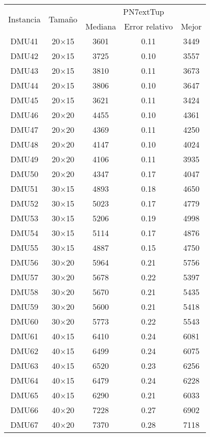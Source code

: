 \begin{table}[H]
\centering
\begin{tabular}{@{}ccccc@{}}
\toprule
\multirow{2}{*}{Instancia} & \multirow{2}{*}{Tamaño} & \multicolumn{3}{c}{PN7extTup} \\ \cmidrule(lr){3-5}
& & Mediana& Error relativo & Mejor  \\ \midrule
DMU41 & 20$\times$15 & 3601 & 0.11 & 3449\\ 
DMU42 & 20$\times$15 & 3725 & 0.10 & 3557\\ 
DMU43 & 20$\times$15 & 3810 & 0.11 & 3673\\ 
DMU44 & 20$\times$15 & 3806 & 0.10 & 3647\\ 
DMU45 & 20$\times$15 & 3621 & 0.11 & 3424\\ 
DMU46 & 20$\times$20 & 4455 & 0.10 & 4361\\ 
DMU47 & 20$\times$20 & 4369 & 0.11 & 4250\\ 
DMU48 & 20$\times$20 & 4147 & 0.10 & 4024\\ 
DMU49 & 20$\times$20 & 4106 & 0.11 & 3935\\ 
DMU50 & 20$\times$20 & 4347 & 0.17 & 4047\\ 
DMU51 & 30$\times$15 & 4893 & 0.18 & 4650\\ 
DMU52 & 30$\times$15 & 5023 & 0.17 & 4779\\ 
DMU53 & 30$\times$15 & 5206 & 0.19 & 4998\\ 
DMU54 & 30$\times$15 & 5114 & 0.17 & 4876\\ 
DMU55 & 30$\times$15 & 4887 & 0.15 & 4750\\ 
DMU56 & 30$\times$20 & 5964 & 0.21 & 5756\\ 
DMU57 & 30$\times$20 & 5678 & 0.22 & 5397\\ 
DMU58 & 30$\times$20 & 5670 & 0.21 & 5435\\ 
DMU59 & 30$\times$20 & 5600 & 0.21 & 5418\\ 
DMU60 & 30$\times$20 & 5773 & 0.22 & 5543\\ 
DMU61 & 40$\times$15 & 6410 & 0.24 & 6081\\ 
DMU62 & 40$\times$15 & 6499 & 0.24 & 6075\\ 
DMU63 & 40$\times$15 & 6520 & 0.23 & 6256\\ 
DMU64 & 40$\times$15 & 6479 & 0.24 & 6228\\ 
DMU65 & 40$\times$15 & 6290 & 0.21 & 6033\\ 
DMU66 & 40$\times$20 & 7228 & 0.27 & 6902\\ 
DMU67 & 40$\times$20 & 7370 & 0.28 & 7118\\ 

\end{tabular}
\end{table}
